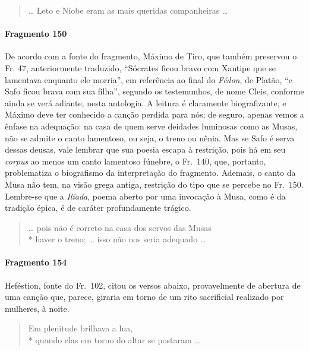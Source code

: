\begin{verse}
\ldots{} Leto e Níobe eram as mais queridas \qb{}companheiras \ldots{}
\end{verse}

\paragraph{Fragmento 150}

{\small De acordo com a fonte do fragmento, Máximo de Tiro, que também preservou o Fr.
47, anteriormente traduzido, ``Sócrates ficou bravo com Xantipe que se
lamentava enquanto ele morria”, em referência ao final do \textit{Fédon}, de
Platão, ``e Safo ficou brava com sua filha”, segundo os testemunhos, de
nome Cleis, conforme ainda se verá adiante, nesta antologia. A leitura é
claramente biografizante, e Máximo deve ter conhecido a canção perdida para
nós; de seguro, apenas vemos a ênfase na adequação: na casa de quem serve
deidades luminosas como as Musas, não se admite o canto lamentoso, ou seja, o
treno ou nênia. Mas se Safo é serva dessas deusas, vale lembrar que sua poesia
escapa à restrição, pois há em seu \textit{corpus} ao menos um canto lamentoso
fúnebre, o Fr.~140, que, portanto, problematiza o biografismo da interpretação
do fragmento. Ademais, o canto da Musa não tem, na visão grega antiga,
restrição do tipo que se percebe no Fr.~150. Lembre-se que a \textit{Ilíada},
poema aberto por uma invocação à Musa, como é da tradição épica, é de caráter
profundamente trágico.}

\begin{verse}
\ldots{} pois não é correto na casa dos servos das \qb{}Musas\\*
haver o treno; \ldots{} isso não nos seria adequado \ldots{}
\end{verse}

\paragraph{Fragmento 154}

{\small Heféstion, fonte do Fr.~102, citou os versos abaixo, provavelmente de abertura
de uma canção que, parece, giraria em torno de um rito sacrificial realizado
por mulheres, à noite.}

\begin{verse}
Em plenitude brilhava a lua, \\*
quando elas em torno do altar se postaram \ldots{}
\end{verse}


